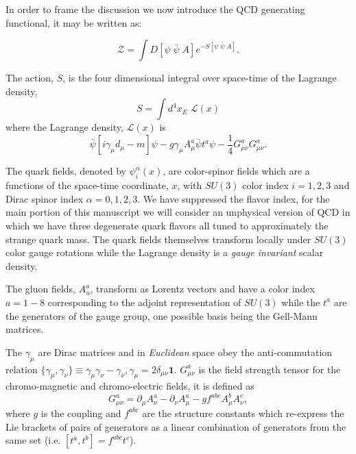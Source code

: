  In order to frame the discussion we now introduce the QCD generating functional, it may be written as:

\begin{equation}
\mathcal{Z} = \int D[\psi \; \bar{\psi} \;A] e^{-S[\psi \;\bar{\psi}\;A]}.
\end{equation} 

The action, $S$, is the four dimensional integral over space-time of the Lagrange density, 
\begin{equation*}
S = \int d^4x_E \; \mathcal{L}(x)
\end{equation*}
where the Lagrange density, $\mathcal{L}(x)$ is 
\begin{equation}
\bar{\psi}\left[i \gamma_\mu d_\mu - m\right]\psi - g \gamma_\mu A_\mu^a\bar{\psi}t^a\psi - \frac{1}{4}G_{\mu\nu}^aG_{\mu\nu}^a.
\end{equation}

The quark fields, denoted by $\psi^\alpha_i(x)$,  are color-spinor fields which are a functions of the space-time coordinate, $x$, with $SU(3)$ color index $i=1,2,3$ and Dirac spinor index $\alpha=0,1,2,3$. We have suppressed the flavor index, for the main portion of this manuscript we will consider an unphysical version of QCD in which we have three degenerate quark flavors all tuned to approximately the strange quark mass. The quark fields themselves transform locally under $SU(3)$ color gauge rotations while the Lagrange density is a \emph{gauge invariant} scalar density. 

The gluon fields, $A_u^a$, transform as Lorentz vectors and have a color index $a=1-8$ corresponding to the adjoint representation of $SU(3)$ while the $t^a$ are the generators of the gauge group, one possible basis being the Gell-Mann matrices. 

The $\gamma_\mu$ are Dirac matrices and in \emph{Euclidean} space obey the anti-commutation relation $\{\gamma_\mu,\gamma_\nu\} \equiv \gamma_\mu\gamma_\nu - \gamma_\nu,\gamma_\mu = 2\delta_{\mu\nu}\mathbf{1}$.  $G_{\mu\nu}^a$ is the field strength tensor for the chromo-magnetic and chromo-electric fields, it is defined as 
\begin{equation*}
G_{\mu\nu}^a = \partial_\mu A_\nu^a - \partial_\nu A_\mu^a - gf^{abc}A^b_\mu A^c_\nu,
\end{equation*}
where $g$ is the coupling and $f^{abc}$ are the structure constants which re-express the Lie brackets of pairs of generators as a linear combination of generators from the same set (i.e. $\left[t^a,t^b\right] = f^{abc}t^c$).

